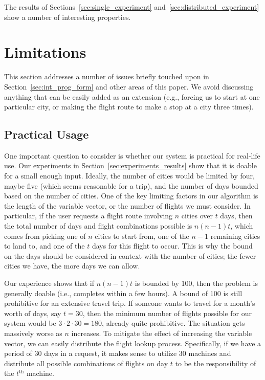\documentclass{article}
\begin{document}
The results of Sections~\ref{sec:single_experiment} and~\ref{sec:distributed_experiment} show a number of interesting properties.

\section{Limitations}\label{sec:limitations}

This section addresses a number of issues briefly touched upon in Section~\ref{sec:int_prog_form} and other areas of this paper. We avoid discussing
anything that can be easily added as an extension (e.g., forcing us to start at one particular city, or making the flight route to make a stop at a
city three times).

\subsection{Practical Usage}

One important question to consider is whether our system is practical for real-life use. Our experiments in Section~\ref{sec:experiments_results} show
that it is doable for a small enough input. Ideally, the number of cities would be limited by four, maybe five (which seems reasonable for a trip),
and the number of days bounded based on the number of cities. One of the key limiting factors in our algorithm is the length of the variable vector,
or the number of flights we must consider. In particular, if the user requests a flight route involving $n$ cities over $t$ days, then the total
number of days and flight combinations possible is $n(n-1)t$, which comes from picking one of $n$ cities to start from, one of the $n-1$ remaining
cities to land to, and one of the $t$ days for this flight to occur. This is why the bound on the days should be considered in context with the number
of cities; the fewer cities we have, the more days we can allow.

Our experience shows that if $n(n-1)t$ is bounded by 100, then the problem is generally doable (i.e., completes within a few hours).
A bound of 100 is still prohibitive for an extensive travel trip. If someone wants to travel for a month's worth of days, say $t = 30$, then the
minimum number of flights possible for our system would be $3\cdot 2\cdot 30 = 180$, already quite prohibitive. The situation gets massively worse as
$n$ increases. To mitigate the effect of increasing the variable vector, we can easily distribute the flight lookup process. Specifically, if we have
a period of 30 days in a request, it makes sense to utilize 30 machines and distribute all possible combinations of flights on day $t$ to be the
responsibility of the $t^{\text{th}}$ machine.
\end{document}
